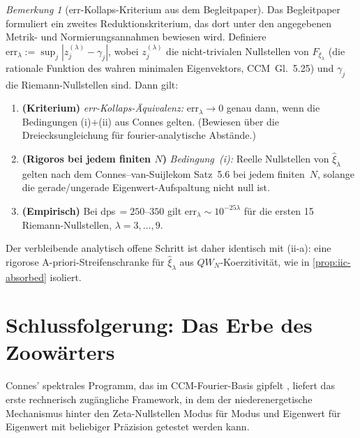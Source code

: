 \documentclass[12pt,a4paper]{article}
\theoremstyle{definition}
\theoremstyle{remark}
\newtheorem{remark}[theorem]{Bemerkung}
\begin{document}
\begin{remark}[err-Kollaps-Kriterium aus dem Begleitpaper]
\label{rem:err-collapse}
Das Begleitpaper \cite{Geiger2026evendom} formuliert ein zweites
Reduktionskriterium, das dort unter den angegebenen Metrik- und
Normierungsannahmen bewiesen wird. Definiere
$\mathrm{err}_\lambda := \sup_j |z_j^{(\lambda)} - \gamma_j|$, wobei
$z_j^{(\lambda)}$ die nicht-trivialen Nullstellen von $F_{\xi_\lambda}$
(die rationale Funktion des wahren minimalen Eigenvektors, CCM~Gl.~5.25)
und $\gamma_j$ die Riemann-Nullstellen sind. Dann gilt:
\begin{enumerate}[label=(\alph*)]
  \item \textbf{(Kriterium)} \emph{err-Kollaps-Äquivalenz:}
    $\mathrm{err}_\lambda \to 0$ genau dann, wenn die Bedingungen
    (i)$+$(ii) aus Connes \cite[§6.6]{Connes2026} gelten. (Bewiesen
    über die Dreiecksungleichung für fourier-analytische Abstände.)
  \item \textbf{(Rigoros bei jedem finiten $N$)} \emph{Bedingung~(i):}
    Reelle Nullstellen von $\hat{\xi}_\lambda$ gelten nach dem
    Connes--van-Suijlekom Satz~5.6 \cite{ConnesvS2025} bei jedem
    finiten~$N$, solange die gerade/ungerade Eigenwert-Aufspaltung
    nicht null ist.
  \item \textbf{(Empirisch)} Bei dps\,$= 250$--$350$ gilt
    $\mathrm{err}_\lambda \sim 10^{-25\lambda}$ für die ersten
    15 Riemann-Nullstellen, $\lambda=3,\ldots,9$.
\end{enumerate}
Der verbleibende analytisch offene Schritt ist daher identisch mit
(ii-a): eine rigorose A-priori-Streifenschranke für $\hat{\xi}_\lambda$
aus $QW_N$-Koerzitivität, wie in \cref{prop:iic-absorbed} isoliert.
\end{remark}

\section{Schlussfolgerung: Das Erbe des Zoowärters}
\label{sec:conclusion}

Connes' spektrales Programm, das im CCM-Fourier-Basis gipfelt
\cite{CCM2025}, liefert das erste rechnerisch zugängliche
Framework, in dem der niederenergetische Mechanismus hinter den Zeta-Nullstellen
Modus für Modus und Eigenwert für Eigenwert mit beliebiger Präzision
getestet werden kann.
\end{document}
